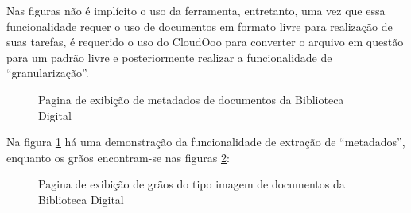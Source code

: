 \newpage
Nas figuras não é implícito o uso da ferramenta, entretanto, uma vez que essa funcionalidade requer o uso de documentos em formato livre para realização de suas tarefas, é requerido o uso do CloudOoo para converter o arquivo em questão para um padrão livre e posteriormente realizar a funcionalidade de ``granularização''.

\begin{figure}[ht]
    \centering
    \caption{Pagina de exibição de metadados de documentos da Biblioteca Digital}
    \label{metadados}
\end{figure}

\newpage
Na figura \ref{metadados} há uma demonstração da funcionalidade de extração de ``metadados'', enquanto os grãos encontram-se nas figuras \ref{imagens}:

\begin{figure}[ht]
    \centering
    \caption{Pagina de exibição de grãos do tipo imagem de documentos da Biblioteca Digital}
    \label{imagens}
\end{figure}

